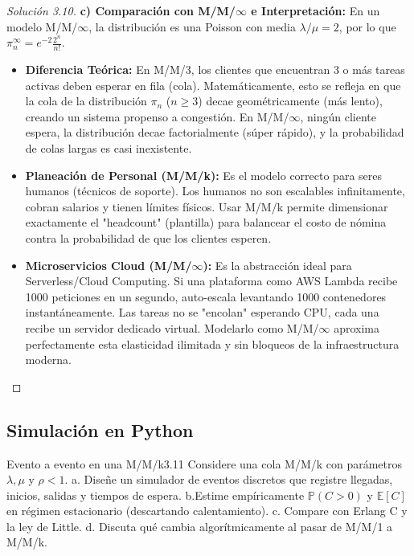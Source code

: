 \documentclass[10pt,a4paper]{article}
\begin{document}
\begin{proof}[Solución 3.10]
    \textbf{c) Comparación con M/M/$\infty$ e Interpretación:}
    En un modelo M/M/$\infty$, la distribución es una Poisson con media $\lambda/\mu = 2$, por lo que $\pi_n^{\infty} = e^{-2} \frac{2^n}{n!}$.
    \begin{itemize}
        \item \textbf{Diferencia Teórica:} En M/M/3, los clientes que encuentran 3 o más tareas activas deben esperar en fila (cola). Matemáticamente, esto se refleja en que la cola de la distribución $\pi_n$ ($n \ge 3$) decae geométricamente (más lento), creando un sistema propenso a congestión. En M/M/$\infty$, ningún cliente espera, la distribución decae factorialmente (súper rápido), y la probabilidad de colas largas es casi inexistente.
        \item \textbf{Planeación de Personal (M/M/k):} Es el modelo correcto para seres humanos (técnicos de soporte). Los humanos no son escalables infinitamente, cobran salarios y tienen límites físicos. Usar M/M/k permite dimensionar exactamente el "headcount" (plantilla) para balancear el costo de nómina contra la probabilidad de que los clientes esperen.
        \item \textbf{Microservicios Cloud (M/M/$\infty$):} Es la abstracción ideal para Serverless/Cloud Computing. Si una plataforma como AWS Lambda recibe 1000 peticiones en un segundo, auto-escala levantando 1000 contenedores instantáneamente. Las tareas no se "encolan" esperando CPU, cada una recibe un servidor dedicado virtual. Modelarlo como M/M/$\infty$ aproxima perfectamente esta elasticidad ilimitada y sin bloqueos de la infraestructura moderna.
    \end{itemize}
\end{proof}

\newpage
\subsection{Simulación en Python}

\begin{ejercicio}{Evento a evento en una M/M/k}{3.11}
    Considere una cola M/M/k con parámetros $\lambda, \mu$ y $\rho < 1$.
    a. Diseñe un simulador de eventos discretos que registre llegadas, inicios, salidas y tiempos de espera.
    b.Estime empíricamente $\mathbb{P}(C>0)$ y $\mathbb{E}[C]$ en régimen estacionario (descartando calentamiento).
    c. Compare con Erlang C y la ley de Little.
    d. Discuta qué cambia algorítmicamente al pasar de M/M/1 a M/M/k.
\end{ejercicio}
\end{document}
